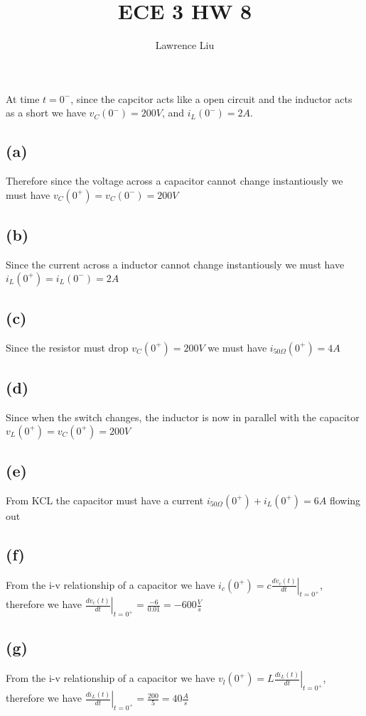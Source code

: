 \documentclass[12pt]{article}
\title{ECE 3 HW 8}
\author{Lawrence Liu}
\begin{document}
\maketitle
At time $t=0^-$, since the capcitor acts like a open circuit and the inductor acts as a short we have $v_C(0^-)=200V$, and $i_L(0^-)=2A$.
\subsection*{(a)}
Therefore since the voltage across a capacitor cannot change instantiously we must have $v_C(0^+)=v_C(0^-)=\boxed{200V}$
\subsection*{(b)}
Since the current across a inductor cannot change instantiously we must have $i_L(0^+)=i_L(0^-)=\boxed{2A}$
\subsection*{(c)}
Since the resistor must drop $v_C(0^+)=200V$ we must have $i_{50\Omega}(0^+)=\boxed{4A}$
\subsection*{(d)}
Since when the switch changes, the inductor is now in parallel with the capacitor $v_L(0^+)=v_C(0^+)=\boxed{200V}$
\subsection*{(e)}
From KCL the capacitor must have a current $i_{50\Omega}(0^+)+i_L(0^+)=\boxed{6A}$ flowing out
\subsection*{(f)}
From the i-v relationship of a capacitor we have $i_c(0^+)=\left.c\frac{dv_c(t)}{dt}\right|_{t=0^+}$, 
therefore we have $\left.\frac{dv_c(t)}{dt}\right|_{t=0^+}=\frac{-6}{0.01}=\boxed{-600\frac{V}{s}}$
\subsection*{(g)}
From the i-v relationship of a capacitor we have $v_l(0^+)=\left.L\frac{di_L(t)}{dt}\right|_{t=0^+}$, 
therefore we have $\left.\frac{di_L(t)}{dt}\right|_{t=0^+}=\frac{200}{5}=\boxed{40\frac{A}{s}}$
\end{document}
